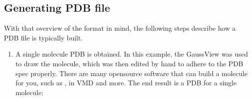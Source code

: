 \documentclass[letterpaper,10pt,english]{sphinxmanual}
\begin{document}
\subsection{Generating PDB file}
\label{\detokenize{input_file:generating-pdb-file}}
With that overview of the format in mind, the following steps describe how a PDB file is typically built.
\begin{enumerate}
%
\item {} 
A single molecule PDB is obtained. In this example, the GaussView was used to draw the molecule, which was then edited by hand to adhere
to the PDB spec properly. There are many open\sphinxhyphen{}source software that can build a molecule for you, such as  ,
 in VMD and more. The end result is a PDB for a single molecule:

\end{enumerate}
\end{document}
